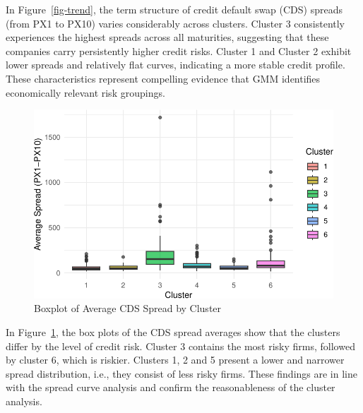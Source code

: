 \documentclass[
  letterpaper,
  DIV=11,
  numbers=noendperiod]{scrartcl}
\begin{document}
In Figure~\ref{fig-trend}, the term structure of credit default swap
(CDS) spreads (from PX1 to PX10) varies considerably across clusters.
Cluster 3 consistently experiences the highest spreads across all
maturities, suggesting that these companies carry persistently higher
credit risks. Cluster 1 and Cluster 2 exhibit lower spreads and
relatively flat curves, indicating a more stable credit profile. These
characteristics represent compelling evidence that GMM identifies
economically relevant risk groupings.

\begin{figure}

{\centering \includegraphics{437_final_project_files/figure-pdf/fig-boxplot-1.pdf}

}

\caption{\label{fig-boxplot}Boxplot of Average CDS Spread by Cluster}

\end{figure}

In Figure~\ref{fig-boxplot}, the box plots of the CDS spread averages
show that the clusters differ by the level of credit risk. Cluster 3
contains the most risky firms, followed by cluster 6, which is riskier.
Clusters 1, 2 and 5 present a lower and narrower spread distribution,
i.e., they consist of less risky firms. These findings are in line with
the spread curve analysis and confirm the reasonableness of the cluster
analysis.
\end{document}

